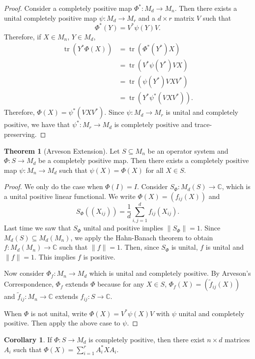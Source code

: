 \documentclass[12pt]{article}
\theoremstyle{definition}
\newtheorem*{theorem}{Theorem}
\newtheorem*{corollary}{Corollary}
\DeclareMathOperator{\tr}{tr}
\newcommand{\C}{\mathbb{C}}
\begin{document}
\begin{proof}
Consider a completely positive map $\Phi^*:M_d \to M_n$. Then there exists a unital completely positive map $\psi:M_d \to M_r$ and a $d \times r$ matrix $V$ such that
\[
\Phi^*(Y)=V^*\psi(Y)V.
\]
Therefore, if $X \in M_n$, $Y \in M_d$,
\begin{align*}
\tr(Y^*\Phi(X)) &= \tr(\Phi^*(Y^*)X) \\
&= \tr(V^*\psi(Y^*)VX) \\
&= \tr(\psi(Y^*)VXV^*) \\
&= \tr(Y^*\psi^*(VXV^*)).
\end{align*}
Therefore, $\Phi(X)=\psi^*(VXV^*)$. Since $\psi:M_d \to M_r$ is unital and completely positive, we have that $\psi^*:M_r \to M_d$ is completely positive and trace-preserving.
\end{proof}

\begin{theorem}[Arveson Extension]
Let $S \subseteq M_n$ be an operator system and $\Phi:S \to M_d$ be a completely positive map. Then there exists a completely positive map $\psi:M_n \to M_d$ such that $\psi(X)=\Phi(X)$ for all $X \in S$.
\end{theorem}

\begin{proof}
We only do the case when $\Phi(I)=I$. Consider $S_\Phi:M_d(S) \to \C$, which is a unital positive linear functional. We write $\Phi(X)=(f_{ij}(X))$ and
\[
S_\Phi((X_{ij}))=\frac{1}{d}\sum_{i,j=1}^d f_{ij}(X_{ij}).
\]
Last time we saw that $S_\Phi$ unital and positive implies $\|S_\Phi\|=1$. Since $M_d(S) \subseteq M_d(M_n)$, we apply the Hahn-Banach theorem to obtain $f:M_d(M_n) \to \C$ such that $\|f\|=1$. Then, since $S_\Phi$ is unital, $f$ is unital and $\|f\|=1$. This implies $f$ is positive.

Now consider $\Phi_f:M_n \to M_d$ which is unital and completely positive. By Arveson's Correspondence, $\Phi_f$ extends $\Phi$ because for any $X \in S$, $\Phi_f(X)=(\widetilde{f}_{ij}(X))$ and $\widetilde{f}_{ij}:M_n \to \C$ extends $f_{ij}:S \to \C$.

When $\Phi$ is not unital, write $\Phi(X)=V^*\psi(X)V$ with $\psi$ unital and completely positive. Then apply the above case to $\psi$.
\end{proof}

\begin{corollary}
If $\Phi:S \to M_d$ is completely positive, then there exist $n \times d$ matrices $A_i$ such that $\Phi(X)=\sum_{i=1}^r A_i^*XA_i$.
\end{corollary}
\end{document}
